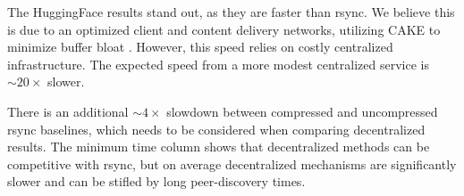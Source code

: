 


The HuggingFace results stand out, as they are faster than rsync.
We believe this is due to an optimized client and content delivery networks, utilizing CAKE
  \cite{hoiland2018piece} to minimize buffer bloat \cite{gettys2012bufferbloat}.
However, this speed relies on costly centralized infrastructure.
The expected speed from a more modest centralized service is $\sim\!20\times$ slower.

There is an additional $\sim\!4\times$  slowdown between compressed and uncompressed rsync baselines, which needs to be
  considered when comparing decentralized results.
The minimum time column shows that decentralized methods can be competitive with rsync, but on
  average decentralized mechanisms are significantly slower and can be stifled by long peer-discovery times.


